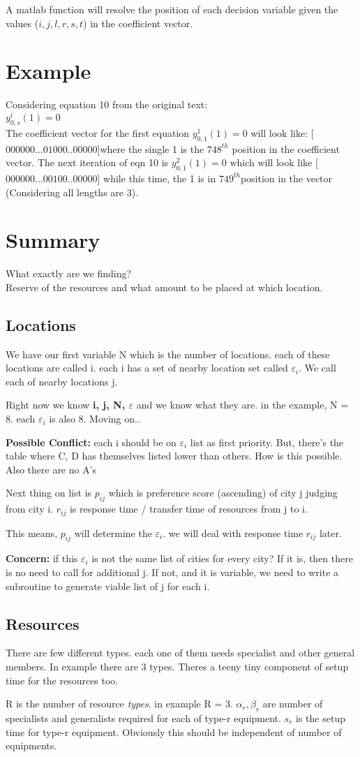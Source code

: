 \documentclass[11pt]{article}
\DeclareRobustCommand{\mybox}[2][gray!20]{%
\begin{tcolorbox}[   %
        breakable,
        left=0pt,
        right=0pt,
        top=0pt,
        bottom=0pt,
        colback=#1,
        colframe=#1,
        width=\dimexpr\textwidth\relax, 
        enlarge left by=0mm,
        boxsep=5pt,
        arc=0pt,outer arc=0pt,
        ]
        #2
\end{tcolorbox}
}
\begin{document}
\par \noindent A matlab function will resolve the position of each decision variable given the values ($i, j, l, r, s, t$) in the coefficient vector.
\section{Example}
Considering equation 10 from the original text:\\
$y^i_{0,s}(1) = 0$\\
The coefficient vector for the first equation $ y^1_{0,1}(1) = 0$ will look like: [$000000...01000..00000$]where the single 1 is the $748^{th}$ position in the coefficient vector. The next iteration of eqn 10 is $ y^2_{0,1}(1) = 0$ which will look like [$000000...00100..00000$] while this time, the 1 is in $749^{th}$position in the vector (Considering all lengths are 3).


\pagebreak
\section{Summary}
What exactly are we finding?\\
Reserve of the resources and what amount to be placed at which location.\\
\subsection{Locations}
\mybox[green!10]{We have our first variable N which is the number of locations. each of these locations are called i. each i has a set of nearby location set called $\varepsilon_i$. We call each of nearby locations j.} 
Right now we know \textbf{i, j, N, $\varepsilon$ }and we know what they are. in the example, N = 8. each $\varepsilon_i$ is also 8. Moving on..

\mybox[red!40]{\textbf{Possible Conflict:} each i should be on $\varepsilon_i$ list as first priority. But, there's the table where C, D has themselves listed lower than others. How is this possible. Also there are no A's}
\mybox[green!10]{Next thing on list is $p_{ij}$ which is preference score (ascending) of city j judging from city i. $r_{ij}$ is response time / transfer time of resources from j to i.}
This means, $p_{ij}$ will determine the $\varepsilon_i$. we will deal with response time $r_{ij}$ later.
\mybox[red!10]{\textbf{Concern:} if this $\varepsilon_i$ is not the same list of cities for every city? If it is, then there is no need to call for additional j. If not, and it is variable, we need to write a subroutine to generate viable list of j for each i.}
\subsection{Resources} There are few different types. each one of them needs specialist and other general members. In example there are 3 types. Theres a teeny tiny  component of setup time for the resources too. 
\mybox[green!10]{R is the number of resource \textit{types}. in example R = 3. $\alpha_r, \beta_r$ are number of specialists and generalists required for each of type-r equipment. $s_r$ is the setup time for type-r equipment. Obviously this should be independent of number of equipments.}
\end{document}
